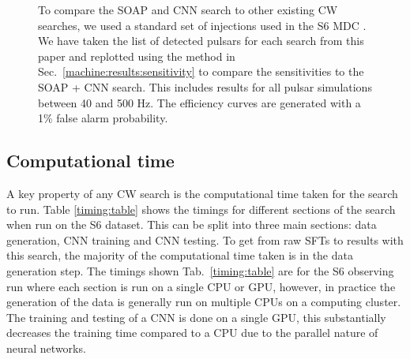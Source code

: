 \begin{figure}
	\caption[S6 \gls{MDC} results from SOAP and \gls{CNN} search.]{\label{machine:results:s6mdc} To compare the SOAP and \gls{CNN} search to other existing \gls{CW} searches, we used a standard set of injections used in the S6 \gls{MDC} \citep{walsh2016ComparisonMethods}.
	We have taken the list of detected pulsars for each search
	from this paper \citep{walsh2016ComparisonMethods} and replotted using the
	method in Sec.~\ref{machine:results:sensitivity} to compare the sensitivities to the SOAP + \gls{CNN} search. 
	This includes results for all pulsar simulations between 40 and 500 Hz. 
	The efficiency curves are generated with a 1\% false alarm probability. }
	
\end{figure}

\subsection{\label{machine:results:timing} Computational time}


A key property of any \gls{CW} search is the computational
time taken for the search to run. 
Table \ref{timing:table} shows the timings for different sections of the search when run on the S6 dataset. 
This can be split into three main sections: data generation, \gls{CNN} training and \gls{CNN} testing.
To get from raw \glspl{SFT} to results with this search, the majority of the computational time taken is in the data generation step.
The timings shown Tab.~\ref{timing:table} are for the S6 observing run where each section is run on a single \gls{CPU} or \gls{GPU}, however, in practice the generation of the data is generally run on multiple \glspl{CPU} on a computing cluster.
The training and testing of a \gls{CNN} is done on a single \gls{GPU}, this substantially decreases the training time compared to a \gls{CPU} due to the parallel nature of neural networks. 


